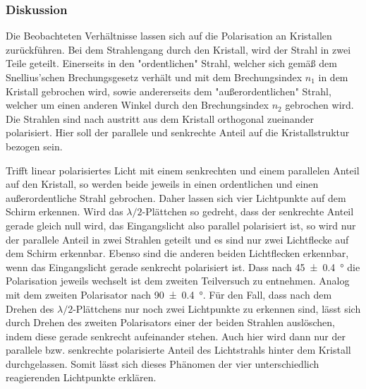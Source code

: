 	\subsubsection*{Diskussion}
	
		Die Beobachteten Verhältnisse lassen sich auf die Polarisation an Kristallen zurückführen.
		Bei dem Strahlengang durch den Kristall, wird der Strahl in zwei Teile geteilt.
		Einerseits in den "ordentlichen" Strahl, welcher sich gemäß dem Snellius'schen Brechungsgesetz verhält und mit dem Brechungsindex $n_1$ in dem Kristall gebrochen wird, sowie andererseits dem "außerordentlichen" Strahl, welcher um einen anderen Winkel durch den Brechungsindex $n_2$ gebrochen wird.
		Die Strahlen sind nach austritt aus dem Kristall orthogonal zueinander polarisiert.
		Hier soll der parallele und senkrechte Anteil auf die Kristallstruktur bezogen sein.
		
		Trifft linear polarisiertes Licht mit einem senkrechten und einem parallelen Anteil auf den Kristall, so werden beide jeweils in einen ordentlichen und einen außerordentliche Strahl gebrochen.
		Daher lassen sich vier Lichtpunkte auf dem Schirm erkennen.
		Wird das $\lambda/2$-Plättchen so gedreht, dass der senkrechte Anteil gerade gleich null wird, das Eingangslicht also parallel polarisiert ist, so wird nur der parallele Anteil in zwei Strahlen geteilt und es sind nur zwei Lichtflecke auf dem Schirm erkennbar.
		Ebenso sind die anderen beiden Lichtflecken erkennbar, wenn das Eingangslicht gerade senkrecht polarisiert ist.
		Dass nach \SI{45+-0,4}{\degree} die Polarisation jeweils wechselt ist dem zweiten Teilversuch zu entnehmen.
		Analog mit dem zweiten Polarisator nach \SI{90+-0,4}{\degree}.
		Für den Fall, dass nach dem Drehen des $\lambda/2$-Plättchens nur noch zwei Lichtpunkte zu erkennen sind, lässt sich durch Drehen des zweiten Polarisators einer der beiden Strahlen auslöschen, indem diese gerade senkrecht aufeinander stehen.
		Auch hier wird dann nur der parallele bzw. senkrechte polarisierte Anteil des Lichtstrahls hinter dem Kristall durchgelassen.
		Somit lässt sich dieses Phänomen der vier unterschiedlich reagierenden Lichtpunkte erklären.